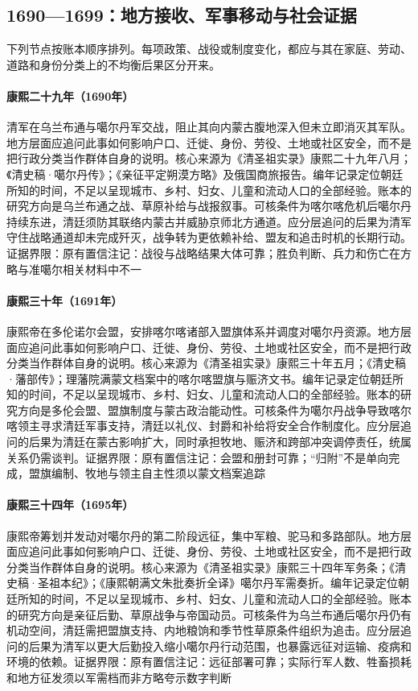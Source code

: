 \subsection{1690—1699：地方接收、军事移动与社会证据}
下列节点按账本顺序排列。每项政策、战役或制度变化，都应与其在家庭、劳动、道路和身份分类上的不均衡后果区分开来。
\hypertarget{social:EQ-1690-ULAN-BUTUNG}{}\paragraph{康熙二十九年（1690年）}清军在乌兰布通与噶尔丹军交战，阻止其向内蒙古腹地深入但未立即消灭其军队。地方层面应追问此事如何影响户口、迁徙、身份、劳役、土地或社区安全，而不是把行政分类当作群体自身的说明。核心来源为《清圣祖实录》康熙二十九年八月；《清史稿·噶尔丹传》；《亲征平定朔漠方略》及俄国商旅报告。编年记录定位朝廷所知的时间，不足以呈现城市、乡村、妇女、儿童和流动人口的全部经验。账本的研究方向是乌兰布通之战、草原补给与战报叙事。可核条件为喀尔喀危机后噶尔丹持续东进，清廷须防其联络内蒙古并威胁京师北方通道。应分层追问的后果为清军守住战略通道却未完成歼灭，战争转为更依赖补给、盟友和追击时机的长期行动。证据界限：原有置信注记：战役与战略结果大体可靠；胜负判断、兵力和伤亡在方略与准噶尔相关材料中不一
\hypertarget{social:EQ-1691-DOLONNOR}{}\paragraph{康熙三十年（1691年）}康熙帝在多伦诺尔会盟，安排喀尔喀诸部入盟旗体系并调度对噶尔丹资源。地方层面应追问此事如何影响户口、迁徙、身份、劳役、土地或社区安全，而不是把行政分类当作群体自身的说明。核心来源为《清圣祖实录》康熙三十年五月；《清史稿·藩部传》；理藩院满蒙文档案中的喀尔喀盟旗与赈济文书。编年记录定位朝廷所知的时间，不足以呈现城市、乡村、妇女、儿童和流动人口的全部经验。账本的研究方向是多伦会盟、盟旗制度与蒙古政治能动性。可核条件为噶尔丹战争导致喀尔喀领主寻求清廷军事支持，清廷以礼仪、封爵和补给将安全合作制度化。应分层追问的后果为清廷在蒙古影响扩大，同时承担牧地、赈济和跨部冲突调停责任，统属关系仍需谈判。证据界限：原有置信注记：会盟和册封可靠；“归附”不是单向完成，盟旗编制、牧地与领主自主性须以蒙文档案追踪
\hypertarget{social:EQ-1695-GALDAN-CAMPAIGN}{}\paragraph{康熙三十四年（1695年）}康熙帝筹划并发动对噶尔丹的第二阶段远征，集中军粮、驼马和多路部队。地方层面应追问此事如何影响户口、迁徙、身份、劳役、土地或社区安全，而不是把行政分类当作群体自身的说明。核心来源为《清圣祖实录》康熙三十四年军务条；《清史稿·圣祖本纪》；《康熙朝满文朱批奏折全译》噶尔丹军需奏折。编年记录定位朝廷所知的时间，不足以呈现城市、乡村、妇女、儿童和流动人口的全部经验。账本的研究方向是亲征后勤、草原战争与帝国动员。可核条件为乌兰布通后噶尔丹仍有机动空间，清廷需把盟旗支持、内地粮饷和季节性草原条件组织为追击。应分层追问的后果为清军以更大后勤投入缩小噶尔丹行动范围，也暴露远征对运输、疫病和环境的依赖。证据界限：原有置信注记：远征部署可靠；实际行军人数、牲畜损耗和地方征发须以军需档而非方略夸示数字判断
